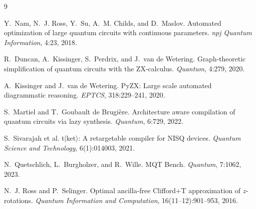 \documentclass[a4paper]{article}
\begin{document}
\begin{thebibliography}{9}

Y.~Nam, N.~J. Ross, Y.~Su, A.~M. Childs, and D.~Maslov.
\newblock Automated optimization of large quantum circuits with continuous parameters.
\newblock \emph{npj Quantum Information}, 4:23, 2018.

R.~Duncan, A.~Kissinger, S.~Perdrix, and J.~van de Wetering.
\newblock Graph-theoretic simplification of quantum circuits with the ZX-calculus.
\newblock \emph{Quantum}, 4:279, 2020.

A.~Kissinger and J.~van de Wetering.
\newblock PyZX: Large scale automated diagrammatic reasoning.
\newblock \emph{EPTCS}, 318:229--241, 2020.

S.~Martiel and T.~Goubault de Brugi\`ere.
\newblock Architecture aware compilation of quantum circuits via lazy synthesis.
\newblock \emph{Quantum}, 6:729, 2022.

S.~Sivarajah et al.
\newblock t$|$ket$\rangle$: A retargetable compiler for NISQ devices.
\newblock \emph{Quantum Science and Technology}, 6(1):014003, 2021.

N.~Quetschlich, L.~Burgholzer, and R.~Wille.
\newblock MQT Bench.
\newblock \emph{Quantum}, 7:1062, 2023.

N.~J. Ross and P.~Selinger.
\newblock Optimal ancilla-free Clifford+T approximation of $z$-rotations.
\newblock \emph{Quantum Information and Computation}, 16(11--12):901--953, 2016.

\end{thebibliography}
\end{document}
